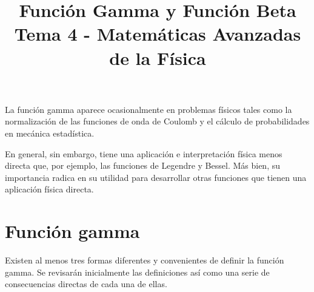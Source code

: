 
\marginsize{1cm}{1cm}{2cm}{2cm}
\title{Función Gamma y Función Beta \\ {\large Tema 4 - Matemáticas Avanzadas de la Física}\vspace{-1.5\baselineskip}}
\date{ }
\author{}

\maketitle
\fontsize{14}{14}\selectfont
La función gamma aparece ocasionalmente en problemas físicos tales como la normalización de las funciones de onda de Coulomb y el cálculo de probabilidades en mecánica estadística.
\par
En general, sin embargo, tiene una aplicación e interpretación física menos directa que, por ejemplo, las funciones de Legendre y Bessel. Más bien, su importancia radica en su utilidad para desarrollar otras funciones que tienen una aplicación física directa.
\section{Función gamma}
Existen al menos tres formas diferentes y convenientes de definir la función gamma. Se revisarán inicialmente las definiciones así como una serie de consecuencias directas de cada una de ellas.
